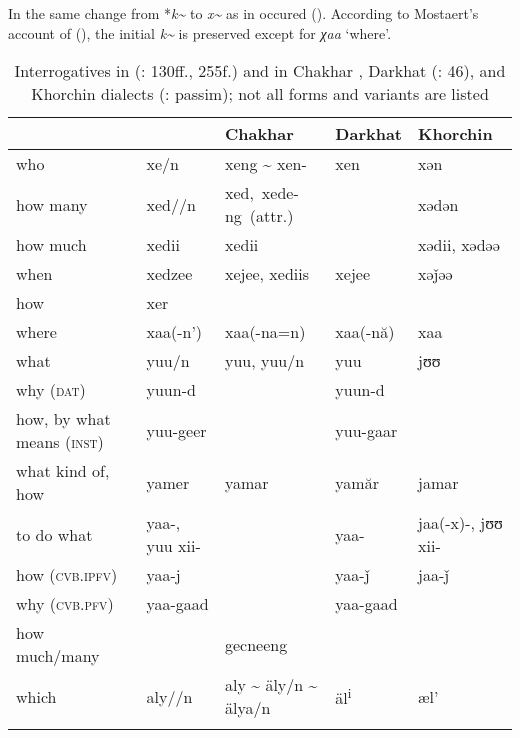 In \textit{} the same change from *\textit{k{\textasciitilde}} to \textit{x{\textasciitilde}} as in  occured (). According to Mostaert’s account of  (), the initial \textit{k{\textasciitilde}} is preserved except for \textit{χaa} ‘where’.

\begin{table}
\caption{Interrogatives in  (\citealt{Janhunen2012c}: 130ff., 255f.) and in Chakhar \citep{Sechenbaatar2003}, Darkhat (\citealt{Gáspár2006}: 46), and Khorchin dialects (\citealt{Yamakoshi2015}: passim); not all forms and variants are listed}
\label{tab:mong:21}

\begin{tabularx}{\textwidth}{QlQlQ}
\lsptoprule
& \textbf{} & \textbf{Chakhar} & \textbf{Darkhat} & \textbf{Khorchin}\\
\midrule
who & xe/n & xeng {\textasciitilde} xen- & xen & xən\\
how many & xed//n & \mbox{xed, xede-ng (attr.)} &  & xədən\\
how much & xedii & xedii &  & xədii, xədəə\\
when & xedzee & xejee, xediis & xejee & xəǰəə\\
how & xer &  &  & \\
where & xaa(-n’) & xaa(-na=n) & xaa(-nă) & xaa\\
what & yuu/n & yuu, yuu/n & yuu & jʊʊ\\
why (\textsc{dat}) & yuun-d &  & yuun-d & \\
how, by what means (\textsc{inst}) & yuu-geer &  & yuu-gaar & \\
what kind of, how & yamer & yamar & yamăr & jamar\\
to do what & yaa-, yuu xii- &  & yaa- & jaa(-x)-, jʊʊ xii-\\
how (\textsc{cvb.ipfv}) & yaa-j &  & yaa-ǰ & jaa-ǰ\\
why (\textsc{cvb.pfv}) & yaa-gaad &  & yaa-gaad & \\
how much/many &  & gecneeng &  & \\
which & aly//n & aly {\textasciitilde} äly/n {\textasciitilde} älya/n & äl\textsuperscript{i} & æl'\\
\lspbottomrule
\end{tabularx}
\end{table}

